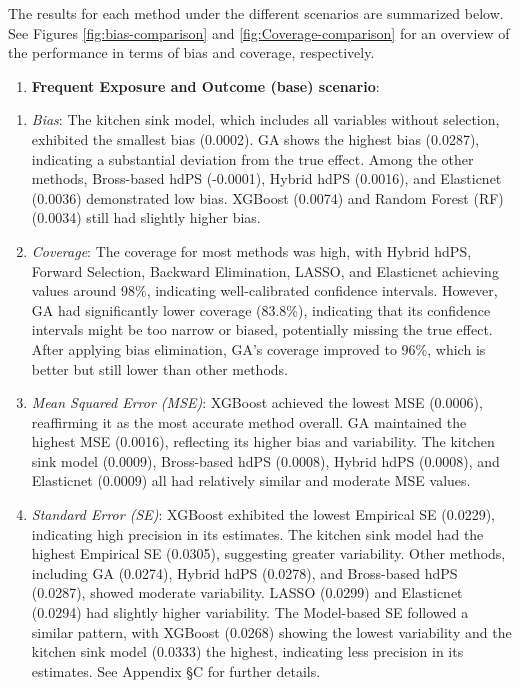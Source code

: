 \documentclass[sn-vancouver,Numbered,lineno,pdflatex]{sn-jnl}
\providecommand{\tightlist}{%
  \setlength{\itemsep}{0pt}\setlength{\parskip}{0pt}}
\begin{document}
The results for each method under the different scenarios are summarized
below. See Figures \ref{fig:bias-comparison} and
\ref{fig:Coverage-comparison} for an overview of the performance in
terms of bias and coverage, respectively.

\begin{enumerate}
\def\labelenumi{(\roman{enumi})}
\tightlist
\item
  \textbf{Frequent Exposure and Outcome (base) scenario}:
\end{enumerate}

\begin{enumerate}
\def\labelenumi{\arabic{enumi}.}
\item
  \emph{Bias}: The kitchen sink model, which includes all variables
  without selection, exhibited the smallest bias (0.0002). GA shows the
  highest bias (0.0287), indicating a substantial deviation from the
  true effect. Among the other methods, Bross-based hdPS (-0.0001),
  Hybrid hdPS (0.0016), and Elasticnet (0.0036) demonstrated low bias.
  XGBoost (0.0074) and Random Forest (RF) (0.0034) still had slightly
  higher bias.
\item
  \emph{Coverage}: The coverage for most methods was high, with Hybrid
  hdPS, Forward Selection, Backward Elimination, LASSO, and Elasticnet
  achieving values around 98\%, indicating well-calibrated confidence
  intervals. However, GA had significantly lower coverage (83.8\%),
  indicating that its confidence intervals might be too narrow or
  biased, potentially missing the true effect. After applying bias
  elimination, GA's coverage improved to 96\%, which is better but still
  lower than other methods.
\item
  \emph{Mean Squared Error (MSE)}: XGBoost achieved the lowest MSE
  (0.0006), reaffirming it as the most accurate method overall. GA
  maintained the highest MSE (0.0016), reflecting its higher bias and
  variability. The kitchen sink model (0.0009), Bross-based hdPS
  (0.0008), Hybrid hdPS (0.0008), and Elasticnet (0.0009) all had
  relatively similar and moderate MSE values.
\item
  \emph{Standard Error (SE)}: XGBoost exhibited the lowest Empirical SE
  (0.0229), indicating high precision in its estimates. The kitchen sink
  model had the highest Empirical SE (0.0305), suggesting greater
  variability. Other methods, including GA (0.0274), Hybrid hdPS
  (0.0278), and Bross-based hdPS (0.0287), showed moderate variability.
  LASSO (0.0299) and Elasticnet (0.0294) had slightly higher
  variability. The Model-based SE followed a similar pattern, with
  XGBoost (0.0268) showing the lowest variability and the kitchen sink
  model (0.0333) the highest, indicating less precision in its
  estimates. See Appendix \S C for further details.
\end{enumerate}
\end{document}
